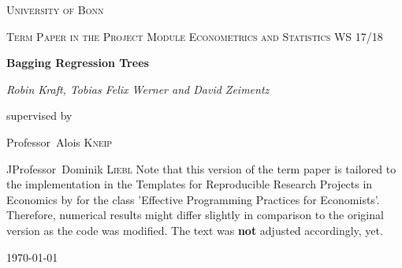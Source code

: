 \documentclass[11pt,a4paper,leqno]{article}
\numberwithin{equation}{section} %
\theoremstyle{definition}
\begin{document}

\begin{titlepage}
	\centering
	{\scshape\LARGE University of Bonn \par}
	\vspace{1cm}
	{\scshape\Large Term Paper in the Project Module Econometrics and Statistics WS 17/18\par}
	\vspace{1.5cm}
	{\huge\bfseries Bagging Regression Trees\par}
	\vspace{2cm}
	{\Large\itshape Robin Kraft, Tobias Felix Werner and David Zeimentz\par}
	\vfill
	supervised by\par
	Professor~Alois \textsc{Kneip} \par
	JProfessor~Dominik \textsc{Liebl}
    \vfill
    {\Large Note that this version of the term paper is tailored to the implementation in the Templates for Reproducible Research Projects in Economics
    by \cite{Gaudecker2014} for the class 'Effective Programming Practices for Economists'.
    Therefore, numerical results might differ slightly in comparison
    to the original version as the code was modified.
    The text was \textbf{not} adjusted accordingly, yet.}


	\vfill


	{\large \today\par}
\end{titlepage}
\newpage

\tableofcontents
\newpage

\listoffigures
{}

\listoftables
{}

\newpage
















\newpage


\begin{appendix}


\end{appendix}

\newpage

\printbibliography
{}
\end{document}
